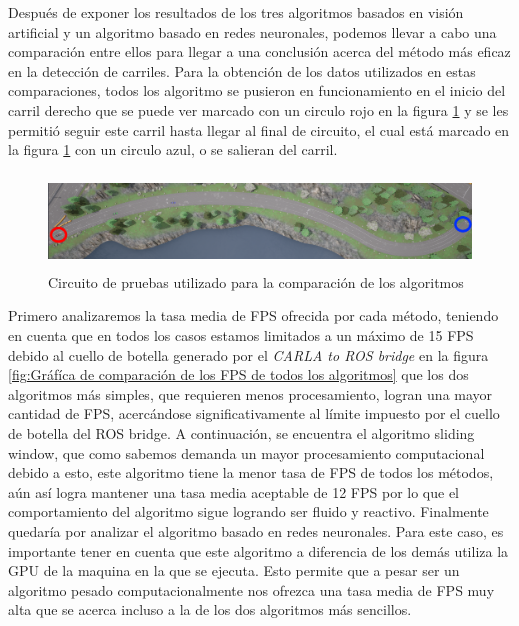 Después de exponer los resultados de los tres algoritmos basados en visión artificial y un algoritmo basado en redes neuronales, podemos llevar a cabo una comparación entre ellos para llegar a una conclusión acerca del método más eficaz en la detección de carriles. Para la obtención de los datos utilizados en estas comparaciones, todos los algoritmo se pusieron en funcionamiento en el inicio del carril derecho que se puede ver marcado con un circulo rojo en la figura \ref{fig:Circuito de pruebas} y se les permitió seguir este carril hasta llegar al final de circuito, el cual está marcado en la figura \ref{fig:Circuito de pruebas} con un circulo azul,  o se salieran del carril.

\bigskip

    \begin{figure}[h]
    \hspace{1cm}
    \includegraphics[height=2.5cm]{imagenes/cap4/circuito_prueba.png}
    \caption{Circuito de pruebas utilizado para la comparación de los algoritmos}
    \label{fig:Circuito de pruebas}
    \end{figure}
    
\bigskip

Primero analizaremos la tasa media de \ac{FPS} ofrecida por cada método, teniendo en cuenta que en todos los casos estamos limitados a un máximo de 15 \ac{FPS} debido al cuello de botella generado por el \textit{CARLA to ROS bridge} en la figura \ref{fig:Gráfíca de comparación de los FPS de todos los algoritmos} que los dos algoritmos más simples, que requieren menos procesamiento, logran una mayor cantidad de \ac{FPS}, acercándose significativamente al límite impuesto por el cuello de botella del ROS bridge. A continuación, se encuentra el algoritmo sliding window, que como sabemos demanda un mayor procesamiento computacional debido a esto, este algoritmo tiene la menor tasa de \ac{FPS} de todos los métodos, aún así logra mantener una tasa media aceptable de 12 \ac{FPS} por lo que el comportamiento del algoritmo sigue logrando ser fluido y reactivo. Finalmente quedaría por analizar el algoritmo basado en redes neuronales. Para este caso, es importante tener en cuenta que este algoritmo a diferencia de los demás utiliza la \ac{GPU} de la maquina en la que se ejecuta. Esto permite que a pesar ser un algoritmo pesado computacionalmente nos ofrezca una tasa media de \ac{FPS} muy alta que se acerca incluso a la de los dos algoritmos más sencillos.
\bigskip

